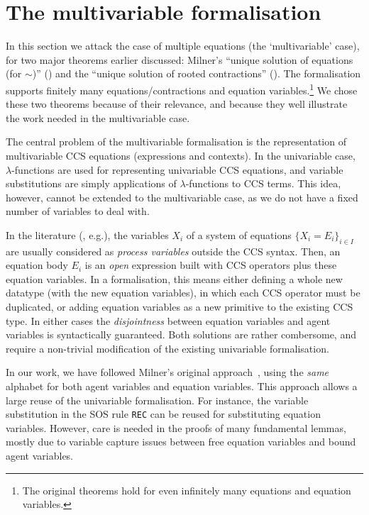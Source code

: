 \documentclass[GCNS]{yincog}
\theoremstyle{remark}
\theoremstyle{theorem}
\theoremstyle{remark}
\newcommand{\univariate}{univariable\xspace}
\newcommand{\multivariate}{multivariable\xspace}
\begin{document}
\section{The \multivariate formalisation}
 \label{sec:multivariate}

In this section we attack the case of multiple equations (the `\multivariate '
case), for two major theorems earlier discussed: Milner's ``unique solution
of equations (for $\sim $)'' () and the ``unique
solution of rooted contractions'' ().
The formalisation supports finitely many equations/contractions and equation
variables.\footnote{The original theorems hold for even infinitely many
equations and equation variables.} We chose these two theorems because
of their relevance, and because they well illustrate the work needed in
the \multivariate case.

The central problem of the \multivariate formalisation is the representation
of \multivariate CCS equations (expressions and contexts). In the
\univariate case, $\lambda $-functions are used for representing
\univariate CCS equations, and variable substitutions are simply applications
of $\lambda $-functions to CCS terms. This idea, however, cannot be extended
to the \multivariate case, as we do not have a fixed number of variables
to deal with.

In the literature (\citep[p.~102]{Gorrieri:2015jt}, e.g.), the variables
$X_i$ of a system of equations $\{X_i = E_i\}_{i\in I}$ are usually considered
as \emph{process variables} outside the CCS syntax. Then, an equation body
$E_i$ is an \emph{open} expression built with CCS operators plus these equation
variables. In a formalisation, this means either defining a whole new datatype
(with the new equation variables), in which each CCS operator must be duplicated,
or adding equation variables as a new primitive to the existing CCS type.
In either cases the \emph{disjointness} between equation variables and agent
variables is syntactically guaranteed. Both solutions are rather combersome,
and require a non-trivial modification of the existing \univariate formalisation.

In our work, we have followed Milner's original approach~\cite{milner1990operational},
using the \emph{same} alphabet for both agent variables and equation variables.
This approach allows a large reuse of the \univariate formalisation. For
instance, the variable substitution in the SOS rule \texttt{REC} can be
reused for substituting equation variables. However, care is needed in
the proofs of many fundamental lemmas, mostly due to variable capture issues
between free equation variables and bound agent variables.
\end{document}
